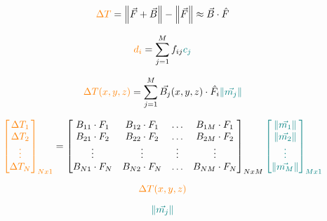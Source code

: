 \begin{equation}
    \textcolor{orange}{\Delta T} = \left\lVert \vec{F} + \vec{B} \right\rVert - \left\lVert \vec{F} \right\rVert \approx  \vec{B} \cdot \hat{F}
\end{equation}

\begin{equation}
\textcolor{orange}{d_i} = \sum_{j=1}^{M}  f_{ij} \textcolor{teal}{c_j}
\end{equation}

\begin{equation}
\textcolor{orange}{\Delta T (x, y, z)} = \sum_{j=1}^{M}  \vec{B_j}(x, y, z) \cdot \hat{F_i} \textcolor{teal}{\left\lVert \vec{m_j} \right\rVert}
\end{equation}

\begin{equation}
\textcolor{orange}{\begin{bmatrix}
    \Delta T_1 \\ \Delta T_2 \\ \vdots \\ \Delta T_N
\end{bmatrix}_{Nx1}} = \begin{bmatrix}
    B_{11} \cdot F_{1} & B_{12} \cdot F_{1} & \hdots & B_{1M} \cdot F_{1} \\
    B_{21} \cdot F_{2} & B_{22} \cdot F_{2} & \hdots & B_{2M} \cdot F_{2} \\
    \vdots & \vdots & \vdots & \vdots \\
    B_{N1} \cdot F_{N} & B_{N2} \cdot F_{N} & \hdots & B_{NM} \cdot F_{N} \\
\end{bmatrix}_{NxM} \textcolor{teal}{\begin{bmatrix}
    \left\lVert \vec{m_1} \right\rVert \\ \left\lVert \vec{m_2} \right\rVert \\ \vdots \\ \left\lVert \vec{m_M} \right\rVert
\end{bmatrix}_{Mx1}}
\end{equation}

\begin{equation}
    \textcolor{orange}{\Delta T (x, y, z)}
\end{equation}

\begin{equation}
  \textcolor{teal}{\left\lVert \vec{m_j} \right\rVert}  
\end{equation}


